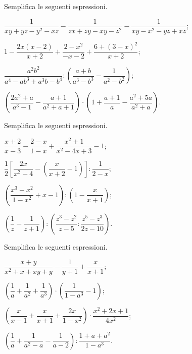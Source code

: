 \begin{esercizio}[\Ast]
\label{ese:14.38}
Semplifica le seguenti espressioni.
\begin{enumeratea}
 \item $\dfrac{1}{xy+yz-y^{2}-xz}-\dfrac{1}{zx+zy-xy-z^{2}}-\dfrac{1}{xy-x^{2}-yz+xz}$;
 \item $1-\dfrac{2x(x-2)}{x+2}+\dfrac{2-x^{2}}{-x-2}+\dfrac{6+(3-x)^{2}}{x+2}$;
 \item $\dfrac{a^{2}b^{2}}{a^{4}-ab^{3}+a^{3}b-b^{4}}:\left(\dfrac{a+b}{a^{3}-b^{3}}-\dfrac{1}{a^{2}-b^{2}}\right)$;
 \item $\left(\dfrac{2a^{2}+a}{a^{3}-1}-\dfrac{a+1}{a^{2}+a+1}\right)\cdot \left(1+\dfrac{a+1}{a}-\dfrac{a^{2}+5a}{a^{2}+a}\right)$.
\end{enumeratea}
\end{esercizio}

\begin{esercizio}[\Ast]
\label{ese:14.39}
Semplifica le seguenti espressioni.
\begin{multicols}{2}
\begin{enumeratea}
 \item $\dfrac{x+2}{x-3}-\dfrac{2-x}{1-x}+\dfrac{x^{2}+1}{x^{2}-4x+3}-1$;
 \item $\dfrac{1}{2}\left[\dfrac{2x}{x^{2}-4}-\left(\dfrac{x}{x+2}-1\right)\right]:\dfrac{1}{2-x}$;
 \item $\left(\dfrac{x^{3}-x^{2}}{1-x^{2}}+x-1\right):\left(1-\dfrac{x}{x+1}\right)$;
 \item $\left(\dfrac{1}{z}-\dfrac{1}{z+1}\right):\left(\dfrac{z^{3}-z^{2}}{z-5}:\dfrac{z^{5}-z^{3}}{2z-10}\right)$.
\end{enumeratea}
\end{multicols}
\end{esercizio}

\begin{esercizio}[\Ast]
\label{ese:14.40}
Semplifica le seguenti espressioni.
\begin{multicols}{2}
\begin{enumeratea}
 \item $\dfrac{x+y}{x^{2}+x+xy+y}-\dfrac{1}{y+1}+\dfrac{x}{x+1}$;
 \item $\left(\dfrac{1}{a}+\dfrac{1}{a^{2}}+\dfrac{1}{a^{3}}\right)\cdot \left(\dfrac{1}{1-a^{3}}-1\right)$;
 \item $\left(\dfrac{x}{x-1}+\dfrac{x}{x+1}+\dfrac{2x}{1-x^{2}}\right)\cdot {\dfrac{x^{2}+2x+1}{4x^{2}}}$;
 \item $\left(\dfrac{1}{a}+\dfrac{1}{a^{{2}}-a}-\dfrac{1}{a-2}\right):\dfrac{1+a+a^{2}}{1-a^{3}}$.
\end{enumeratea}
\end{multicols}
\end{esercizio}

